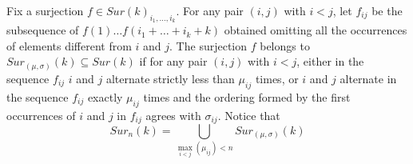 
\begin{definition}
	Fix a surjection $f\in Sur(k)_{i_{1},\dots,i_{k}}$.
	For any pair $(i,j)$ with $i< j$, let $f_{ij}$ be the subsequence of $f(1) \dots f(i_1+\dots+i_k+k)$ obtained omitting all the occurrences of elements different from $i$ and $j$.
	The surjection $f$ belongs to $Sur_{(\mu,\sigma)}(k)\subseteq Sur(k)$ if for any pair $(i,j)$ with $i< j$, either in the sequence $f_{ij}$ $i$ and $j$ alternate strictly less than $\mu_{ij}$ times,
	or $i$ and $j$ alternate in the sequence $f_{ij}$  exactly $\mu_{ij}$ times and the ordering formed by the first occurrences of $i$ and $j$ in $f_{ij}$ agrees with $\sigma_{ij}$.
	Notice that \begin{equation*}
		\label{def}
		Sur_{n}(k)=\bigcup_{\max_{i<j}(\mu_{ij})< n} Sur_{(\mu,\sigma)}(k)
	\end{equation*}

\end{definition}

